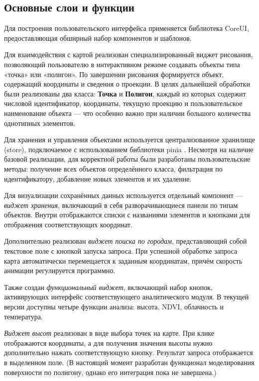 \subsection*{Основные слои и функции}

Для построения пользовательского интерфейса применяется библиотека CoreUI\cite{CoreUI2023}, предоставляющая обширный набор компонентов и шаблонов.

Для взаимодействия с картой реализован специализированный виджет рисования, позволяющий пользователю в интерактивном режиме создавать объекты типа «точка» или «полигон». По завершении рисования формируется объект, содержащий координаты и сведения о проекции. В целях дальнейшей обработки были реализованы два класса: \textbf{Точка} и \textbf{Полигон}, каждый из которых содержит числовой идентификатор, координаты, текущую проекцию и пользовательское наименование объекта — что особенно важно при наличии большого количества однотипных элементов.

Для хранения и управления объектами используется централизованное хранилище (store), подключаемое с использованием библиотеки pinia \cite{Pinia2023}. Несмотря на наличие базовой реализации, для корректной работы были разработаны пользовательские методы: получение всех объектов определённого класса, фильтрация по идентификатору, добавление новых элементов и их удаление.

Для визуализации сохранённых данных используется отдельный компонент — \textit{виджет хранения}, включающий в себя разворачивающиеся панели по типам объектов. Внутри отображаются списки с названиями элементов и кнопками для отображения соответствующих координат.

Дополнительно реализован \textit{виджет поиска по городам}, представляющий собой текстовое поле с кнопкой запуска запроса. При успешной обработке запроса карта автоматически перемещается к заданным координатам, причём скорость анимации регулируется программно.

Также создан \textit{функциональный виджет}, включающий набор кнопок, активирующих интерфейс соответствующего аналитического модуля. В текущей версии доступны четыре функции анализа: высота, NDVI, облачность и температура.


\textit{Виджет высот} реализован в виде выбора точек на карте. При клике отображаются координаты, а для получения значения высоты нужно дополнительно нажать соответствующую кнопку. Результат запроса отображается в выделенном поле. (В настоящий момент разработан функционал моделирования поверхности по полигону, однако его интеграция пока не завершена.)

